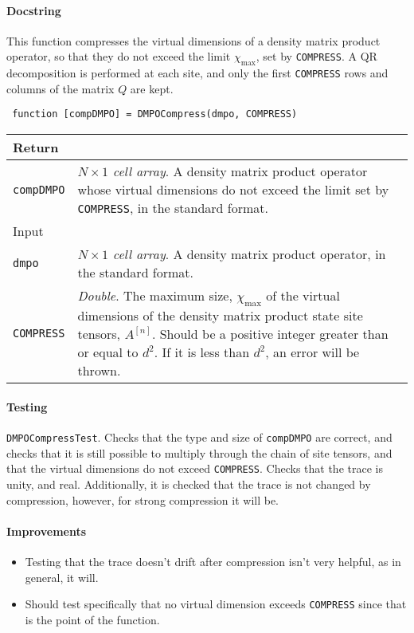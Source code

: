  \paragraph{Docstring} This function compresses the virtual dimensions of a density matrix product operator, so that they do not exceed the limit \(\chi_{\mathrm{max}}\), set by \lstinline$COMPRESS$. A QR decomposition is performed at each site, and only the first \lstinline$COMPRESS$ rows and columns of the matrix \(Q\) are kept. 
 \begin{lstlisting}
 function [compDMPO] = DMPOCompress(dmpo, COMPRESS) \end{lstlisting}
 \begin{longtabu}{X[1,l]X[4,l]}
 \hline
 Return & \\ \hline
 \lstinline$compDMPO$ & \emph{\(N \times 1\) cell array}. A density matrix product operator whose virtual dimensions do not exceed the limit set by \lstinline$COMPRESS$, in the standard format. \\ \hline
 Input & \\ \hline
 \lstinline$dmpo$ & \emph{\(N \times 1\) cell array}. A density matrix product operator, in the standard format. \\
 \lstinline$COMPRESS$ & \emph{Double}. The maximum size, \(\chi_{\mathrm{max}}\) of the virtual dimensions of the density matrix product state site tensors, \(A^{[n]}\). Should be a positive integer greater than or equal to \(d^{2}\). If it is less than \(d^{2}\), an error will be thrown. \\
 \hline
 \end{longtabu}
 \paragraph{Testing} \lstinline$DMPOCompressTest$. Checks that the type and size of \lstinline$compDMPO$ are correct, and checks that it is still possible to multiply through the chain of site tensors, and that the virtual dimensions do not exceed \lstinline$COMPRESS$. Checks that the trace is unity, and real. Additionally, it is checked that the trace is not changed by compression, however, for strong compression it will be.
 \paragraph{Improvements}
 \begin{itemize}
 \item Testing that the trace doesn't drift after compression isn't very helpful, as in general, it will.
 \item Should test specifically that no virtual dimension exceeds \lstinline$COMPRESS$ since that is the point of the function.
 \end{itemize}
  
